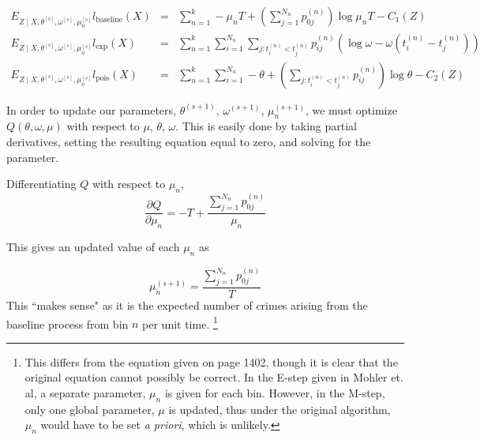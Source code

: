 \documentclass[12pt]{amsart}
\begin{document}
\begin{eqnarray*}
E_{Z \mid X,  \theta^{[s]}, \omega^{[s]}, \mu_n^{[s]}} l_{\text{baseline}}(X) & = & \sum_{n=1}^k -\mu_nT + (\sum_{j=1}^{N_n} p_{0j}^{(n)}) \log \mu_n T - C_1(Z)\\
E_{Z \mid X,  \theta^{[s]}, \omega^{[s]}, \mu_n^{[s]}} l_{\text{exp}}(X) & =  & \sum_{n=1}^k\sum_{i=1}^{N_n} \sum_{j : t_i^{(n)} < t_j^{(n)}} p_{ij}^{(n)}\left ( \log \omega - \omega(t_i^{(n)} - t_j^{(n)}) \right ) \\
E_{Z \mid X,  \theta^{[s]}, \omega^{[s]}, \mu_n^{[s]}} l_{\text{pois}}(X) & =  & \sum_{n=1}^k \sum_{i=1}^{N_n} -\theta + (\sum_{j : t_i^{(n)} < t_j^{(n)}} p_{ij}^{(n)}) \log \theta - C_2(Z)
\end{eqnarray*}


In order to update our parameters, $\theta^{(s+1)}$, $\omega^{(s+1)}$, $\mu_n^{(s+1)}$, we must optimize  $Q(\theta, \omega, \mu)$ with respect to $\mu$, $\theta$, $\omega$. This is easily done by taking partial derivatives, setting the resulting equation equal to zero, and solving for the parameter.

Differentiating $Q$ with respect to $\mu_n$, 
\begin{equation}
\frac{\partial Q}{\partial \mu_n}  =  -T  + \frac{\sum_{j=1}^{N_n} p_{0j}^{(n)}}{\mu_n}
\end{equation}

This gives an updated value of each $\mu_n$ as

\begin{equation*}
\mu_n^{(s+1)} = \frac{\sum_{j=1}^{N_n} p_{0j}^{(n)}}{T}
\end{equation*}
This ``makes sense" as it is the expected number of crimes arising from the baseline process from bin $n$ per unit time. \footnote{This differs from the equation given on page 1402, though it is clear that the original equation cannot possibly be correct. In the E-step given in Mohler et. al, a separate parameter, $\mu_n$ is given for each bin. However, in the M-step, only one global parameter, $\mu$ is updated, thus under the original algorithm, $\mu_n$ would have to be set {\it a priori}, which is unlikely.}
\end{document}
